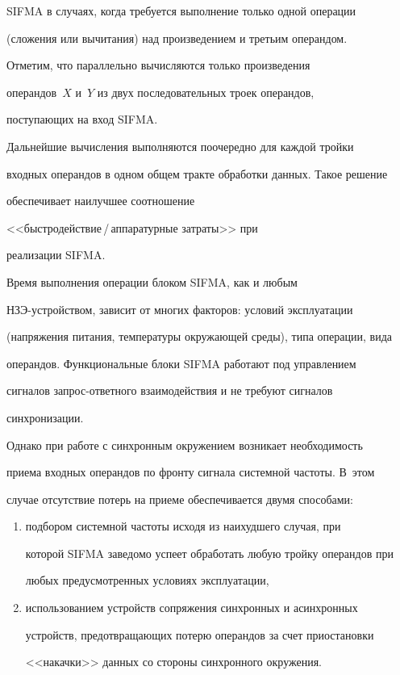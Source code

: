 SIFMA в случаях, когда требуется выполнение только одной операции

(сложения или вычитания) над произведением и третьим операндом.





      Отметим, что параллельно вычисляются только произведения

операндов~$X$ и~$Y$ из двух последовательных троек операндов,

поступающих на вход SIFMA.





      Дальнейшие вычисления выполняются поочередно для каждой тройки

входных операндов в одном общем тракте обработки данных. Такое решение

обеспечивает наилучшее соотношение

      <<быст\-ро\-дей\-ст\-вие\,/\,ап\-па\-ра\-тур\-ные затраты>> при

реализации SIFMA.











      Время выполнения операции блоком SIFMA, как и любым

      НЗЭ-устройст\-вом, зависит от многих факторов: условий эксплуатации

(напряжения питания, температуры окружающей среды), типа операции, вида

операндов. Функциональные блоки SIFMA работают под управлением

сигналов запрос-от\-вет\-но\-го взаимодействия и не требуют сигналов

синхронизации.



      Однако при работе с синхронным окружением возникает необходимость

приема входных операндов по фронту сигнала системной частоты. В~этом

случае отсутствие потерь на приеме обеспечивается двумя способами:

      \begin{enumerate}[(1)]

      \item подбором системной частоты исходя из наихудшего случая, при

которой SIFMA заведомо успеет обработать любую тройку операндов при

любых предусмотренных условиях эксплуатации,

      \item использованием устройств сопряжения синхронных и асинхронных

устройств, предотвращающих потерю операндов за счет приостановки

<<накачки>> данных со стороны синхронного окружения.

      \end{enumerate}



